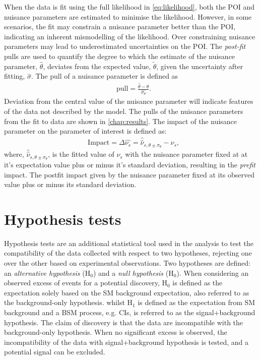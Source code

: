 When the data is fit using the full likelihood in \cref{eq:likelihood}, both the POI and nuisance parameters are estimated to minimise the likelihood. However, in some scenarios, the fit may constrain a nuisance parameter better than the POI, indicating an inherent mismodelling of the likelihood. Over constraining nuisance parameters may lead to underestimated uncertainties on the POI. The \emph{post-fit} pulls are used to quantify the degree to which the estimate of the nuisance parameter, $\hat{\theta}$, deviates from the expected value, $\tilde{\theta}$, given the uncertainty after fitting, $\hat{\sigma}$. The pull of a nuisance parameter is defined as
\begin{equation}
    \label{eq:nppull}
    \begin{aligned}
        & \mathrm{pull} = \frac{\hat{\theta} -{\theta}}{\hat{\sigma_\theta}}.
    \end{aligned}
\end{equation}
Deviation from the central value of the nuisance parameter will indicate features of the data not described by the model. The pulls of the nuisance parameters from the fit to data are shown in \cref{chap:results}. The impact of the nuisance parameter on the parameter of interest is defined as:
\begin{equation}
    \label{eq:npinpact}
    \begin{aligned}
        & \mathrm{Impact} = \Delta \hat{\nu_s} = \hat{\hat{\nu}}_{s,\theta \pm \sigma_\theta} - \hat{\nu}_s,
    \end{aligned}
\end{equation}
where, $\hat{\hat{\nu}}_{s,\theta \pm \sigma_\theta}$, is the fitted value of $\nu_s$ with the nuisance parameter fixed at at it's expectation value plus or minus it's standard deviation, resulting in the \emph{prefit} impact. The postfit impact given by the nuisance parameter fixed at its observed value plus or minus its standard deviation. 


\section{Hypothesis tests}\label{sec:stats:hypo}
Hypothesis tests are an additional statistical tool used in the analysis to test the compatibility of the data collected with respect to two hypotheses, rejecting one over the other based on experimental observations. Two hypotheses are defined: an \emph{alternative hypothesis} ($\mathrm{H_0}$) and a \emph{null hypothesis} ($\mathrm{H_0}$). When considering an observed excess of events for a potential discovery, $\mathrm{H_0}$ is defined as the expectation solely based on the SM background expectation, also referred to as the background-only hypothesis. whilst $\mathrm{H_1}$ is defined as the expectation from SM background and a BSM process, e.g. CIs, is referred to as the signal+background hypothesis. The claim of discovery is that the data are incompatible with the background-only hypothesis. When no significant excess is observed, the incompatibility of the data with signal+background hypothesis is tested, and a potential signal can be excluded. 

